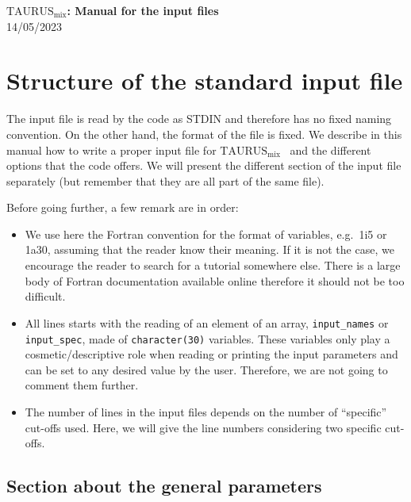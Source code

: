 \documentclass[a4paper,11pt]{article}
\newcommand{\TAURUSmix}{$\text{TAURUS}_{\text{mix}}$}
\newcommand{\ttt}[1]{\texttt{#1}}
\begin{document}
%
% 
\begin{center}
 {\LARGE \textbf{\TAURUSmix: Manual for the input files}} \\[0.20cm]
 {\large 14/05/2023}
\end{center}

%
% 
\section{Structure of the standard input file}

The input file is read by the code as STDIN and therefore has no fixed naming convention. 
On the other hand, the format of the file is fixed. We describe in this manual how to write a proper input file for \TAURUSmix~
and the different options that the code offers.
We will present the different section of the input file separately (but remember that they
are all part of the same file).
 
\noindent Before going further, a few remark are in order:
\begin{itemize}
  \item We use here the Fortran convention for the format of variables, e.g.\ 1i5 or 1a30, assuming that the reader
  know their meaning. If it is not the case, we encourage the reader to search for a tutorial somewhere else.
  There is a large body of Fortran documentation available online therefore it should not be too difficult.

  \item All lines starts with the reading of an element of an array, \ttt{input\_names} or \ttt{input\_spec},
  made of \ttt{character(30)} variables. 
  These variables only play a cosmetic/descriptive role when reading or printing the input parameters and can be
  set to any desired value by the user. Therefore, we are not going to comment them further.

  \item The number of lines in the input files depends on the number of ``specific'' cut-offs used. Here, we will give
  the line numbers considering two specific cut-offs.
\end{itemize}

%
%
\subsection{Section about the general parameters}
\end{document}
